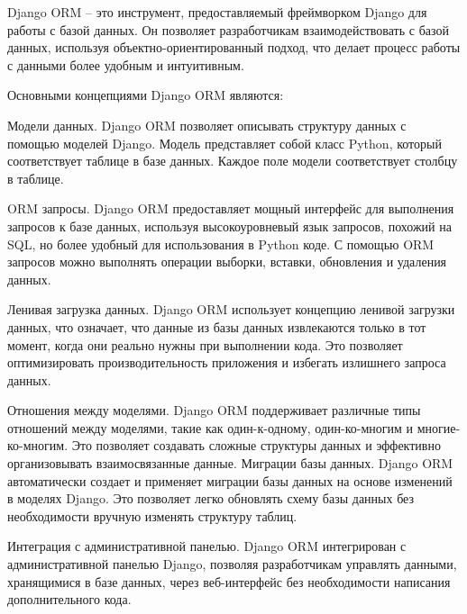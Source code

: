 
Django ORM -- это инструмент, предоставляемый фреймворком Django для работы с базой данных.
Он позволяет разработчикам взаимодействовать с базой данных, используя объектно-ориентированный подход,
что делает процесс работы с данными более удобным и интуитивным.

Основными концепциями Django ORM являются:
\begin{enumerate_num}
    \item Модели данных.
    Django ORM позволяет описывать структуру данных с помощью моделей Django.
    Модель представляет собой класс Python, который соответствует таблице в базе данных.
    Каждое поле модели соответствует столбцу в таблице.
    \item ORM запросы.
    Django ORM предоставляет мощный интерфейс для выполнения запросов к базе данных, используя высокоуровневый язык запросов, похожий на SQL,
    но более удобный для использования в Python коде.
    С помощью ORM запросов можно выполнять операции выборки, вставки, обновления и удаления данных.
    \item Ленивая загрузка данных.
    Django ORM использует концепцию ленивой загрузки данных, что означает,
    что данные из базы данных извлекаются только в тот момент, когда они реально нужны при выполнении кода.
    Это позволяет оптимизировать производительность приложения и избегать излишнего запроса данных.
    \item Отношения между моделями.
    Django ORM поддерживает различные типы отношений между моделями,
    такие как один-к-одному, один-ко-многим и многие-ко-многим.
    Это позволяет создавать сложные структуры данных и эффективно организовывать взаимосвязанные данные.
    Миграции базы данных.
    Django ORM автоматически создает и применяет миграции базы данных на основе изменений в моделях Django.
    Это позволяет легко обновлять схему базы данных без необходимости вручную изменять структуру таблиц.
    \item Интеграция с административной панелью.
    Django ORM интегрирован с административной панелью Django, позволяя разработчикам управлять данными, хранящимися в базе данных, через веб-интерфейс без необходимости написания дополнительного кода.
\end{enumerate_num}



